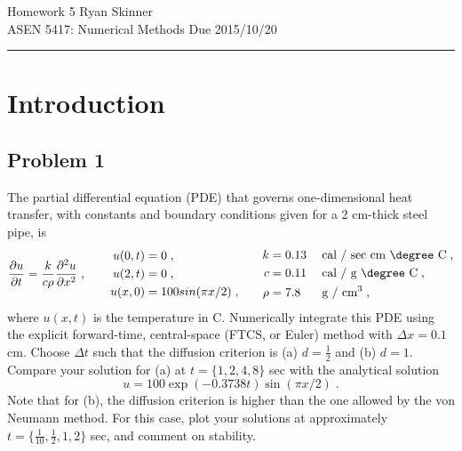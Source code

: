 \documentclass[11pt]{article}
\begin{document}
\pagestyle{fancyplain}
\lhead{}
\chead{}
\rhead{}
\cfoot{\hrule \thepage}

\noindent
{\Large Homework 5}
\hfill
{\large Ryan Skinner}
\\[0.5ex]
{\large ASEN 5417: Numerical Methods}
\hfill
{\large Due 2015/10/20}\\
\hrule
\vspace{6pt}

\section{Introduction} %

\subsection{Problem 1}

The partial differential equation (PDE) that governs one-dimensional heat transfer, with constants and boundary conditions given for a 2 cm-thick steel pipe, is
\begin{equation}
\frac{\partial u}{\partial t} = \frac{k}{c \rho} \frac{\partial^2 u}{\partial x^2}
\;,
\qquad
\begin{aligned}
u(0,t) &= 0 \;, \\
u(2,t) &= 0 \;, \\
u(x,0) &= 100 sin(\pi x / 2) \;,
\end{aligned}
\qquad
\begin{aligned}
k &= 0.13 \; &&\text{cal / sec cm \degree C} \;, \\
c &= 0.11 \; &&\text{cal / g \degree C} \;, \\
\rho &= 7.8 \; &&\text{g / cm$^3$}
\;,
\end{aligned}
\label{eq:prob1}
\end{equation}
where $u(x,t)$ is the temperature in \degree C. Numerically integrate this PDE using the explicit forward-time, central-space (FTCS, or Euler) method with $\Delta x = 0.1$ cm. Choose $\Delta t$ such that the diffusion criterion is (a) $d = \tfrac{1}{2}$ and (b) $d = 1$. Compare your solution for (a) at $t = \{1, 2, 4, 8\}$ sec with the analytical solution
\begin{equation}
u = 100 \exp(-0.3738t) \sin(\pi x / 2)
\;.
\label{eq:prob1_analytic}
\end{equation}
Note that for (b), the diffusion criterion is higher than the one allowed by the von Neumann method. For this case, plot your solutions at approximately $t = \{\tfrac{1}{10}, \tfrac{1}{2}, 1, 2\}$ sec, and comment on stability.
\end{document}

